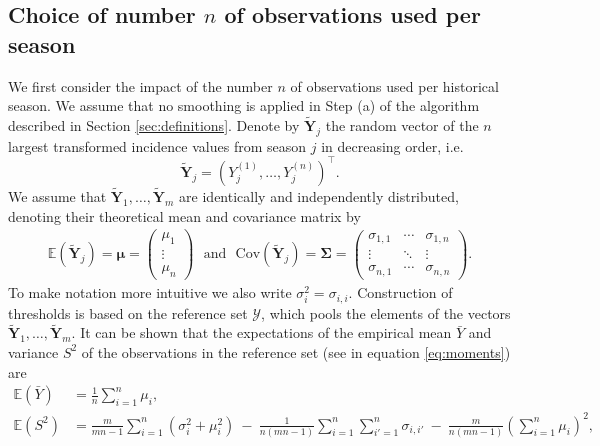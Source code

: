 \documentclass{article}
\begin{document}
\subsection{Choice of number $n$ of observations used per season}
\label{subsec:choice_n}

We first consider the impact of the number $n$ of observations used per historical season. We assume that no smoothing is applied in Step (a) of the algorithm described in Section \ref{sec:definitions}. Denote by $\tilde{\mathbf{Y}}_j$ the random vector of the $n$ largest transformed incidence values from season $j$ in decreasing order, i.e.
$$
\tilde{\mathbf{Y}}_j = (Y^{(1)}_j, \dots, Y^{(n)}_j)^\top.
$$
We assume that $\tilde{\mathbf{Y}}_1, \dots, \tilde{\mathbf{Y}}_m$ are identically and independently distributed, denoting their theoretical mean and covariance matrix by
\begin{align}
\mathbb{E}\left(\tilde{\mathbf{Y}}_j\right) = \boldsymbol{\mu} = \left(\begin{array}{c}
\mu_1\\
\vdots\\
\mu_n
\end{array}\right) \ \ \ \text{and} \ \ \ \text{Cov}\left(\tilde{\mathbf{Y}}_j\right) = \boldsymbol{\Sigma} =
\left(\begin{array}{ccc}
\sigma_{1, 1} & \cdots & \sigma_{1, n}\\
\vdots & \ddots &\vdots\\
\sigma_{n, 1} & \cdots & \sigma_{n, n}
\end{array}\right).
\end{align}
To make notation more intuitive we also write $\sigma^2_i = \sigma_{i, i}$. Construction of thresholds is based on the reference set $\mathcal{Y}$, which pools the elements of the vectors $\tilde{\mathbf{Y}}_1, \dots, \tilde{\mathbf{Y}}_m$. It can be shown that the expectations of the empirical mean $\bar{Y}$ and variance $S^2$ of the observations in the reference set (see in equation \eqref{eq:moments}) are
\begin{align}
\mathbb{E}(\bar{Y}) & = \frac{1}{n} \sum_{i = 1}^n \mu_i,
\label{eq:expectation_mu}\\
\mathbb{E}(S^2) & = \frac{m}{mn - 1} \sum_{i = 1}^n (\sigma_{i}^2 + \mu_i^2) \ - \ \frac{1}{n(mn - 1)} \sum_{i = 1}^n \sum_{i' = 1}^n \sigma_{i,i'} \ - \ \frac{m}{n(mn - 1)}\left(\sum_{i = 1}^n \mu_i\right)^2,
\label{eq:expectation_sigma2}
\end{align}
\end{document}
